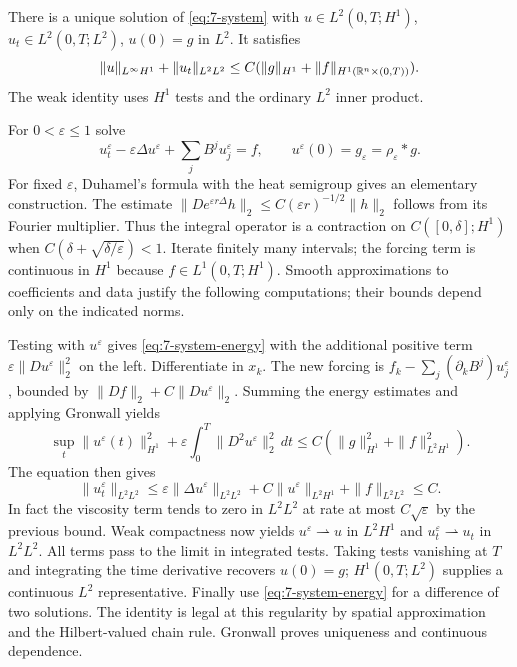\Needspace{55mm}
\begin{theorem}
\label{thm:7-system-existence}
There is a unique solution of \eqref{eq:7-system} with
$u\in L^2(0,T;H^1)$, $u_t\in L^2(0,T;L^2)$, $u(0)=g$ in $L^2$.
It satisfies
\[
 \|u\|_{L^\infty H^1}+\|u_t\|_{L^2L^2}
 \leq C(\|g\|_{H^1}+\|f\|_{H^1(\mathbb{R}^n\times(0,T))}).
\]
The weak identity uses $H^1$ tests and the ordinary $L^2$ inner product.
\end{theorem}
\begin{expandedproof}
For $0<\varepsilon\leq1$ solve
\[
 u_t^\varepsilon-\varepsilon\Delta u^\varepsilon
 +\sum_j B^j u_j^\varepsilon=f,\qquad
 u^\varepsilon(0)=g_\varepsilon=\rho_\varepsilon*g.
\]
For fixed $\varepsilon$, Duhamel's formula with the heat semigroup gives
an elementary construction. The estimate
$\|D e^{\varepsilon r\Delta}h\|_2\leq C(\varepsilon r)^{-1/2}\|h\|_2$
follows from its Fourier multiplier. Thus the integral operator is a
contraction on $C([0,\delta];H^1)$ when
$C(\delta+\sqrt{\delta/\varepsilon})<1$. Iterate finitely many intervals;
the forcing term is continuous in $H^1$ because $f\in L^1(0,T;H^1)$.
Smooth approximations to coefficients and data justify the following
computations; their bounds depend only on the indicated norms.

Testing with $u^\varepsilon$ gives \eqref{eq:7-system-energy} with the
additional positive term $\varepsilon\|Du^\varepsilon\|_2^2$ on the left.
Differentiate in $x_k$. The new forcing is
$f_k-\sum_j(\partial_kB^j)u_j^\varepsilon$, bounded by
$\|Df\|_2+C\|Du^\varepsilon\|_2$.
Summing the energy estimates and applying Gronwall yields
\[
 \sup_t\|u^\varepsilon(t)\|_{H^1}^2
 +\varepsilon\int_0^T\|D^2u^\varepsilon\|_2^2\,dt
 \leq C(\|g\|_{H^1}^2+\|f\|_{L^2H^1}^2).
\]
The equation then gives
\[
 \|u_t^\varepsilon\|_{L^2L^2}
 \leq\varepsilon\|\Delta u^\varepsilon\|_{L^2L^2}
 +C\|u^\varepsilon\|_{L^2H^1}+\|f\|_{L^2L^2}\leq C.
\]
In fact the viscosity term tends to zero in $L^2L^2$ at rate at most
$C\sqrt\varepsilon$ by the previous bound. Weak compactness now yields
$u^\varepsilon\rightharpoonup u$ in $L^2H^1$ and
$u_t^\varepsilon\rightharpoonup u_t$ in $L^2L^2$.
All terms pass to the limit in integrated tests. Taking tests vanishing
at $T$ and integrating the time derivative recovers $u(0)=g$;
$H^1(0,T;L^2)$ supplies a continuous $L^2$ representative.
Finally use \eqref{eq:7-system-energy} for a difference of two solutions.
The identity is legal at this regularity by spatial approximation and
the Hilbert-valued chain rule. Gronwall proves uniqueness and continuous dependence.
\end{expandedproof}
\Needspace{55mm}

